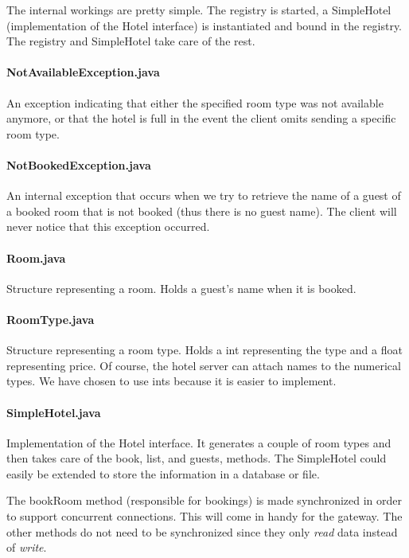 \documentclass[a4paper,10pt]{article}
\begin{document}
The internal workings are pretty simple. The registry is started, a SimpleHotel (implementation of the Hotel interface) is instantiated and bound in the registry. The registry and SimpleHotel take care of the rest. 

\paragraph{NotAvailableException.java}
An exception indicating that either the specified room type was not available anymore, or that the hotel is full in the event the client omits sending a specific room type.

\paragraph{NotBookedException.java}
An internal exception that occurs when we try to retrieve the name of a guest of a booked room that is not booked (thus there is no guest name). The client will never notice that this exception occurred.

\paragraph{Room.java}
Structure representing a room. Holds a guest's name when it is booked.

\paragraph{RoomType.java}
Structure representing a room type. Holds a int representing the type and a float representing price. Of course, the hotel server can attach names to the numerical types. We have chosen to use ints because it is easier to implement.

\paragraph{SimpleHotel.java}
Implementation of the Hotel interface. It generates a couple of room types and then takes care of the book, list, and guests, methods. The SimpleHotel could easily be extended to store the information in a database or file.

The bookRoom method (responsible for bookings) is made synchronized in order to support concurrent connections. This will come in handy for the gateway. The other methods do not need to be synchronized since they only \emph{read} data instead of \emph{write}.
\end{document}
